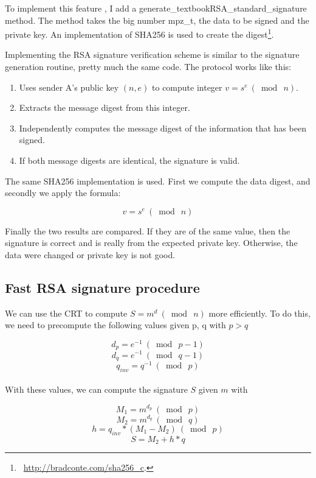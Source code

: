 \documentclass[a4paper]{report}
\begin{document}
To implement this feature , I add a generate\_textbookRSA\_standard\_signature method. The method takes the big number mpz\_t, the data to be signed and the private key. An implementation of SHA256 is used to create the digest\footnote{\ \href{http://bradconte.com/sha256\_c}{\url{http://bradconte.com/sha256\_c}}.}.


Implementing the RSA signature verification scheme is similar to the signature generation routine, pretty much the same code. The protocol works like this:
\begin{enumerate}
    \item Uses sender A's public key $(n, e)$ to compute integer $v = s^e  \ (\bmod{\ n} )$.
    \item Extracts the message digest from this integer.
    \item Independently computes the message digest of the information that has been signed.
    \item If both message digests are identical, the signature is valid.
\end{enumerate}

The same SHA256 implementation is used. First we compute the data digest, and secondly we apply the formula:

\[
v = s^e  \ (\bmod{\ n} )
\]

Finally the two results are compared. If they are of the same value, then the signature is correct and is really from the expected private key. Otherwise, the data were changed or private key is not good.


\newpage
\subsection{Fast RSA signature procedure}
We can use the CRT to compute $S = m^d\ (\bmod{\ n})$ more efficiently. To do this, we need to precompute the following values given p, q with $p > q$

\[
d_p = e^{-1} \ (\bmod{\ p - 1} )
\]
\[
d_q = e^{-1} \ (\bmod{\ q - 1} )
\]
\[
q_{inv} = q^{-1} \ ( \bmod{\ p} )
\]
\\
With these values, we can compute the signature $S$ given $m$ with

\[
M_1 = m^{d_p}\ (\bmod\ p)
\]
\[
M_2 = m^{d_q}\ (\bmod\ q)
\]
\[
h = q_{inv} * (M_1 - M_2)\ (\bmod\ p)
\]
\[
S = M_2 + h*q 
\]
\end{document}
